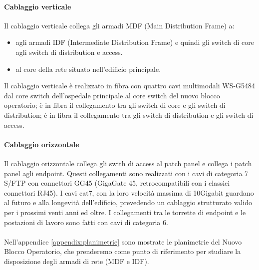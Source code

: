 \paragraph {Cablaggio verticale}
Il cablaggio verticale collega gli armadi MDF (Main Distribution Frame) a:
\begin{itemize}
  \item agli armadi IDF (Intermediate Distribution Frame) e quindi gli switch di core agli switch di distribution e access. 
  \item al core della rete situato nell'edificio principale.
\end{itemize}
Il cablaggio verticale è realizzato in fibra con quattro cavi multimodali WS-G5484 dal core switch dell'ospedale principale al core switch del nuovo blocco operatorio; è in fibra il collegamento tra gli switch di core e gli switch di distribution; è in fibra il collegamento tra gli switch di distribution e gli switch di access. 

\paragraph{Cablaggio orizzontale}
Il cablaggio orizzontale collega gli swith di access al patch panel e collega i patch panel agli endpoint.  Questi collegamenti sono realizzati con i cavi di categoria 7 S/FTP con connettori GG45 (GigaGate 45, retrocompatibili con i classici connettori RJ45). I cavi cat7, con la loro velocità massima di 10Gigabit guardano al futuro e alla longevità dell'edificio, prevedendo un cablaggio strutturato valido per i prossimi venti anni ed oltre.
I collegamenti tra le torrette di endpoint e le postazioni di lavoro sono fatti con cavi di categoria 6.
\paragraph{} Nell'appendice \ref{appendix:planimetrie} sono mostrate le planimetrie del Nuovo Blocco Operatorio, che prenderemo come punto di riferimento per studiare la disposizione degli armadi di rete (MDF e IDF).